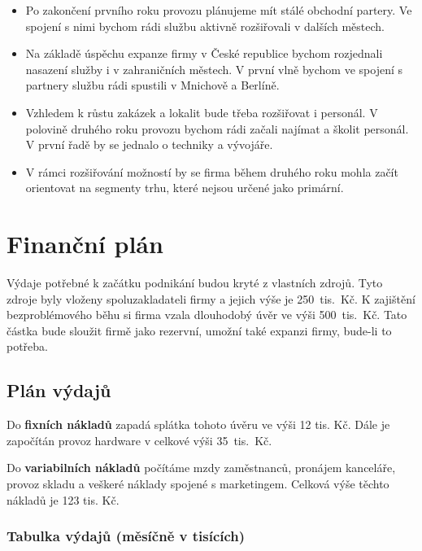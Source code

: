 \documentclass[12pt,czech]{article}
\begin{document}
\begin{itemize}
    \item Po zakončení prvního roku provozu plánujeme mít stálé obchodní partery.
    Ve spojení s nimi bychom rádi službu aktivně rozšiřovali v dalších městech.

    \item Na základě úspěchu expanze firmy v České republice bychom rozjednali nasazení služby i v zahraničních městech.
    V první vlně bychom ve spojení s partnery službu rádi spustili v Mnichově a Berlíně.

    \item Vzhledem k růstu zakázek a lokalit bude třeba rozšiřovat i personál.
    V polovině druhého roku provozu bychom rádi začali najímat a školit personál.
    V první řadě by se jednalo o techniky a vývojáře.

    \item V rámci rozšiřování možností by se firma během druhého roku mohla začít orientovat na segmenty trhu, které nejsou určené jako primární.
\end{itemize}

\newpage
\section{Finanční plán}

Výdaje potřebné k začátku podnikání budou kryté z vlastních zdrojů.
Tyto zdroje byly vloženy spoluzakladateli firmy a jejich výše je 250~tis.~Kč.
K zajištění bezproblémového běhu si firma vzala dlouhodobý úvěr ve výši 500~tis.~Kč.
Tato částka bude sloužit firmě jako rezervní, umožní také expanzi firmy, bude-li to potřeba.

\subsection{Plán výdajů}

Do \textbf{fixních nákladů} zapadá splátka tohoto úvěru ve výši 12 tis. Kč.
Dále je započítán provoz hardware v celkové výši 35~tis.~Kč.

\medskip

\noindent Do \textbf{variabilních nákladů} počítáme mzdy zaměstnanců, pronájem kanceláře, provoz skladu a veškeré náklady spojené s marketingem.
Celková výše těchto nákladů je 123 tis. Kč.

\subsubsection{Tabulka výdajů (měsíčně v tisících)}
\end{document}

